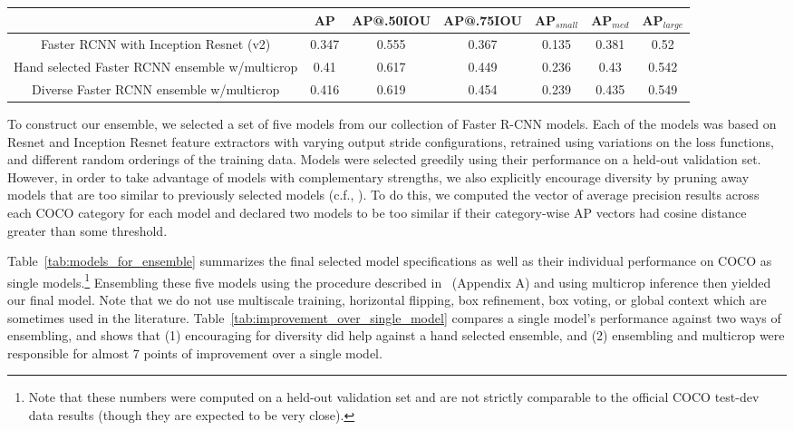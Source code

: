 \documentclass[10pt,twocolumn,letterpaper]{article}
\begin{document}
\begin{table*}[t!]
\begin{center}
{\footnotesize
\begin{tabular}{c|c|c|c|c|c|c}
\, & AP & AP@.50IOU & AP@.75IOU & AP$_{small}$ & AP$_{med}$ & AP$_{large}$ \\
\hline
Faster RCNN with Inception Resnet (v2) & 0.347  & 0.555 & 0.367 &0.135 & 0.381  & 0.52 \\
Hand selected Faster RCNN ensemble w/multicrop & 0.41 & 0.617 & 0.449 & 0.236 & 0.43 & 0.542 \\
Diverse Faster RCNN ensemble w/multicrop & 0.416 & 0.619 & 0.454 & 0.239 & 0.435 & 0.549
\end{tabular}
}
\caption{
\footnotesize Effects of ensembling and multicrop inference.  Numbers reported on COCO test-dev dataset.
Second row (hand selected ensemble) consists of 6 Faster RCNN models
with 3 Resnet 101 (v1) and 3 Inception Resnet (v2) and the third row
(diverse ensemble) is described in detail in
Table~\ref{tab:models_for_ensemble}. 
}
\label{tab:improvement_over_single_model}
\end{center}
\end{table*}

To construct our ensemble, we selected a set of five models from our
collection of Faster R-CNN models.  Each of the models was based on
Resnet and Inception Resnet feature extractors with varying output
stride configurations, retrained using variations on the loss
functions, and different random orderings of the training data.
Models were selected greedily using their performance on a held-out
validation set.  However, in order to take advantage of models with
complementary strengths, we also explicitly encourage diversity by
pruning away models that are too similar to previously selected
models (c.f., \cite{Lee2015diverse}).
To do this, we computed the vector of average precision
results across each COCO category for each model and declared two
models to be too similar if their category-wise AP vectors had cosine
distance greater than some threshold.

Table~\ref{tab:models_for_ensemble} summarizes the final selected
model specifications as well as their individual performance on COCO
as single models.\footnote{Note that these numbers were computed on a
  held-out validation set and are not strictly comparable to the
  official COCO test-dev data results (though they are expected to be
  very close).}  Ensembling these five models using the procedure
described in~\cite{he2015deep} (Appendix A) and using multicrop
inference then yielded our final model.  Note that we do not use
multiscale training, horizontal flipping, box refinement, box voting,
or global context which are sometimes used in the literature.
Table~\ref{tab:improvement_over_single_model} compares a single
model's performance against two ways of ensembling, and shows that (1)
encouraging for diversity did help against a hand selected ensemble,
and (2) ensembling and multicrop were responsible for almost 7 points
of improvement over a single model.
\end{document}
